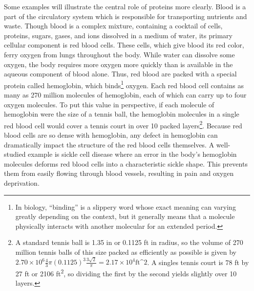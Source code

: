 Some examples will illustrate the central role of proteins more clearly. Blood is a part of the circulatory system which is responsible for transporting nutrients and waste. Though blood is a complex mixture, containing a cocktail of cells, proteins, sugars, gases, and ions dissolved in a medium of water, its primary cellular component is red blood cells. These cells, which give blood its red color, ferry oxygen from lungs throughout the body. While water can dissolve some oxygen, the body requires more oxygen more quickly than is available in the aqueous component of blood alone. Thus, red blood are packed with a special protein called hemoglobin, which binds\footnote{In biology, ``binding'' is a slippery word whose exact meaning can varying greatly depending on the context, but it generally means that a molecule physically interacts with another molecular for an extended period.} oxygen. Each red blood cell contains as many as 270 million molecules of hemoglobin, each of which can carry up to four oxygen molecules. To put this value in perspective, if each molecule of hemoglobin were the size of a tennis ball, the hemoglobin molecules in a single red blood cell would cover a tennis court in over 10 packed layers\footnote{A standard tennis ball is 1.35 in or 0.1125 ft in radius, so the volume of 270 million tennis balls of this size packed as efficiently as possible is given by $2.70 \times 10^6 \frac{4}{3} \pi (0.1125)^3 \frac{3\sqrt{2}}{\pi} = 2.17 \times 10^4 \text{ft^2}$. A singles tennis court is 78 ft by 27 ft or 2106 ft\textsuperscript{2}, so dividing the first by the second yields slightly over 10 layers.}. Because red blood cells are so dense with hemoglobin, any defect in hemoglobin can dramatically impact the structure of the red blood cells themselves. A well-studied example is sickle cell disease where an error in the body's hemoglobin molecules deforms red blood cells into a characteristic sickle shape. This prevents them from easily flowing through blood vessels, resulting in pain and oxygen deprivation.

